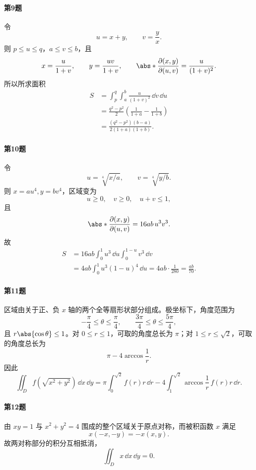 \paragraph{第9题}
\begin{xsolution}
令
\[
  u=x+y,\qquad v=\frac yx.
\]
则 $p\le u\le q$，$a\le v\le b$，且
\[
  x=\frac{u}{1+v},\qquad y=\frac{uv}{1+v},
  \qquad
  \abs*{\frac{\partial(x,y)}{\partial(u,v)}}=\frac{u}{(1+v)^2}.
\]
所以所求面积
\begin{align*}
 S&=\int_p^q\int_a^b\frac{u}{(1+v)^2}\,\dd v\,\dd u\\
 &=\frac{q^2-p^2}{2}\left(\frac1{1+a}-\frac1{1+b}\right)\\
 &=\boxed{\frac{(q^2-p^2)(b-a)}{2(1+a)(1+b)}}.
\end{align*}
\end{xsolution}

\paragraph{第10题}
\begin{xsolution}
令
\[
  u=\sqrt[4]{x/a},\qquad v=\sqrt[4]{y/b}.
\]
则 $x=au^4,y=bv^4$，区域变为
\[
  u\ge0,\quad v\ge0,\quad u+v\le1,
\]
且
\[
  \abs*{\frac{\partial(x,y)}{\partial(u,v)}}=16ab\,u^3v^3.
\]
故
\begin{align*}
 S&=16ab\int_0^1u^3\,\dd u\int_0^{1-u}v^3\,\dd v\\
 &=4ab\int_0^1u^3(1-u)^4\,\dd u
 =4ab\cdot\frac1{280}=\boxed{\frac{ab}{70}}.
\end{align*}
\end{xsolution}

\paragraph{第11题}
\begin{xsolution}
区域由关于正、负 $x$ 轴的两个全等扇形状部分组成。极坐标下，角度范围为
\[
 -\frac\pi4\le\theta\le\frac\pi4,
 \qquad
 \frac{3\pi}{4}\le\theta\le\frac{5\pi}{4},
\]
且 $r\abs{\cos\theta}\le1$。对 $0\le r\le1$，可取的角度总长为 $\pi$；对 $1\le r\le\sqrt2$，可取的角度总长为
\[
  \pi-4\arccos\frac1r.
\]
因此
\[
 \boxed{
 \iint_Df(\sqrt{x^2+y^2})\,\dd x\,\dd y
 =\pi\int_0^{\sqrt2}f(r)r\,\dd r
 -4\int_1^{\sqrt2}\arccos\frac1r\,f(r)r\,\dd r }.
\]
\end{xsolution}

\paragraph{第12题}
\begin{xsolution}
由 $xy=1$ 与 $x^2+y^2=4$ 围成的整个区域关于原点对称，而被积函数 $x$ 满足
\[
  x(-x,-y)=-x(x,y).
\]
故两对称部分的积分互相抵消，
\[
  \boxed{\iint_Dx\,\dd x\,\dd y=0}.
\]
\end{xsolution}

